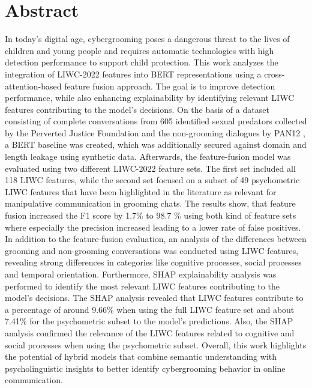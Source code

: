 \chapter{Abstract}

In today's digital age, cybergrooming poses a dangerous threat to the lives of children and young people and requires automatic technologies with high detection performance to support child protection. This work analyzes the integration of LIWC-2022 features \cite{pennebaker2022liwc} into BERT representations \cite{devlin2019bert} using a cross-attention-based feature fusion approach. The goal is to improve detection performance, while also enhancing explainability by identifying relevant LIWC features contributing to the model's decisions. On the basis of a dataset consisting of complete conversations from 605 identified sexual predators collected by the Perverted Justice Foundation and the  non-grooming dialogues by PAN12 \cite{inches2012pan}, a BERT baseline was created, which was additionally secured against domain and length leakage using synthetic data. Afterwards, the feature-fusion model was evaluated using two different LIWC-2022 feature sets. The first set included all 118 LIWC features, while the second set focused on a subset of 49 psychometric LIWC features that have been highlighted in the literature as relevant for manipulative communication in grooming chats. The results show, that feature fusion increased the F1 score by 1.7\% to 98.7 \% using both kind of feature sets where especially the precision increased leading to a lower rate of false positives. In addition to the feature-fusion evaluation, an analysis of the differences between grooming and non-grooming conversations was conducted using LIWC features, revealing strong differences in categories like cognitive processes, social processes and temporal orientation. Furthermore, SHAP \cite{lundberg2017shap} explainability analysis was performed to identify the most relevant LIWC features contributing to the model's decisions. The SHAP analysis revealed that LIWC features contribute to a percentage of around 9.66\% when using the full LIWC feature set and about 7.41\% for the psychometric subset to the model's predictions. Also, the SHAP analysis confirmed the relevance of the LIWC features related to cognitive and social processes when using the psychometric subset. Overall, this work highlights the potential of hybrid models that combine semantic understanding with psycholinguistic insights to better identify cybergrooming behavior in online communication.

